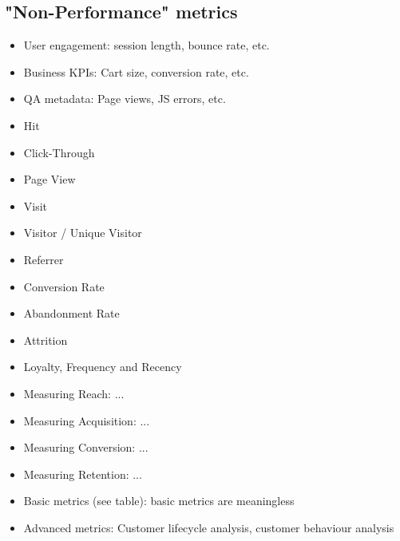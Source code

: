 








\subsection{"Non-Performance" metrics}

\begin{itemize}
\item User engagement: session length, bounce rate, etc.
\item Business KPIs: Cart size, conversion rate, etc.
\item QA metadata: Page views, JS errors, etc.
\end{itemize}



\begin{itemize}
\item Hit
\item Click-Through
\item Page View
\item Visit
\item Visitor / Unique Visitor
\item Referrer
\item Conversion Rate
\item Abandonment Rate
\item Attrition
\item Loyalty, Frequency and Recency
\item Measuring Reach: ...
\item Measuring Acquisition: ...
\item Measuring Conversion: ...
\item Measuring Retention: ...
\end{itemize}


\begin{itemize}
\item Basic metrics (see table): basic metrics are meaningless
\item Advanced metrics: Customer lifecycle analysis, customer behaviour analysis
\end{itemize}


